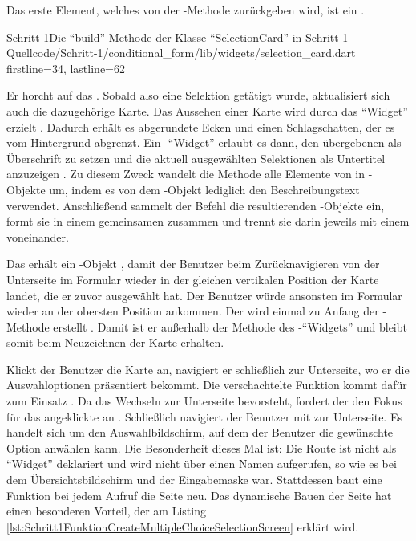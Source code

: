 Das erste Element, welches von der -Methode zurückgeben wird, ist ein  .
\begin{alexlisting}{Schritt 1}{Die \enquote{build}-Methode der Klasse \enquote{SelectionCard} in Schritt 1}
  {Quellcode/Schritt-1/conditional_form/lib/widgets/selection_card.dart}
  {firstline=34, lastline=62}
  \label{lst:Schritt1BuildMethodeDerSelectionCard}
\end{alexlisting}
Er horcht auf das  .
Sobald also eine Selektion getätigt wurde, aktualisiert sich auch die dazugehörige Karte.
Das Aussehen einer Karte wird durch das \enquote{Widget}  erzielt .
Dadurch erhält es abgerundete Ecken und einen Schlagschatten, der es vom Hintergrund abgrenzt.
Ein -\enquote{Widget} erlaubt es dann, den übergebenen  als Überschrift zu setzen  und die aktuell ausgewählten Selektionen als Untertitel anzuzeigen .
Zu diesem Zweck wandelt die Methode  alle Elemente von  in -Objekte um, indem es von dem -Objekt lediglich den Beschreibungstext  verwendet.
Anschließend sammelt der Befehl  die resultierenden -Objekte ein, formt sie in einem gemeinsamen  zusammen und trennt sie darin jeweils mit einem  voneinander.



Das  erhält ein -Objekt , damit der Benutzer beim Zurücknavigieren von der Unterseite im Formular wieder in der gleichen vertikalen Position der Karte landet, die er zuvor ausgewählt hat.
Der Benutzer würde ansonsten im Formular wieder an der obersten Position ankommen.
Der  wird einmal zu Anfang der -Methode erstellt .
Damit ist er außerhalb der Methode  des -\enquote{Widgets} und bleibt somit beim Neuzeichnen der Karte erhalten.


Klickt der Benutzer die Karte an, navigiert er schließlich zur Unterseite, wo er die Auswahloptionen präsentiert bekommt.
Die verschachtelte Funktion  kommt dafür zum Einsatz .
Da das Wechseln zur Unterseite bevorsteht, fordert der  den Fokus für das angeklickte  an .
Schließlich navigiert der Benutzer mit  zur Unterseite.
Es handelt sich um den Auswahlbildschirm, auf dem der Benutzer die gewünschte Option anwählen kann.
Die Besonderheit dieses Mal ist: Die Route ist nicht als \enquote{Widget} deklariert und wird nicht über einen Namen aufgerufen, so wie es bei dem Übersichtsbildschirm und der Eingabemaske war.
Stattdessen baut eine Funktion bei jedem Aufruf die Seite neu.
Das dynamische Bauen der Seite hat einen besonderen Vorteil, der am Listing \ref{lst:Schritt1FunktionCreateMultipleChoiceSelectionScreen} erklärt wird.






